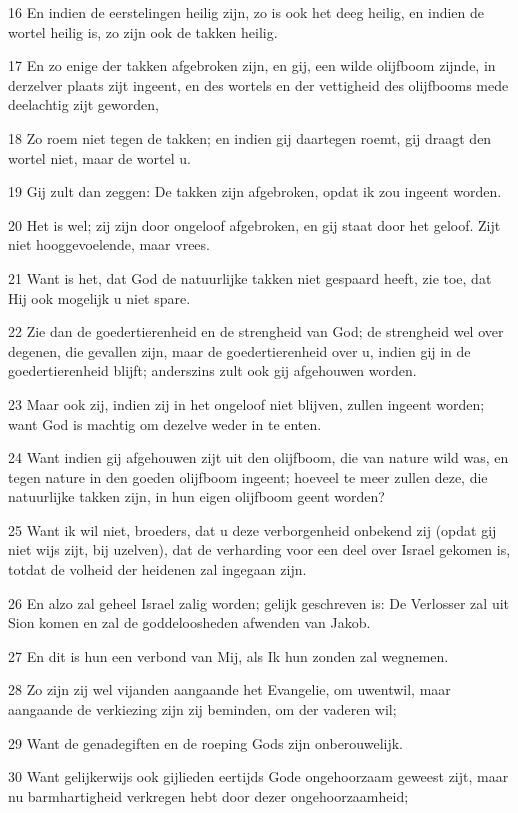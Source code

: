 \par 16 En indien de eerstelingen heilig zijn, zo is ook het deeg heilig, en indien de wortel heilig is, zo zijn ook de takken heilig.
\par 17 En zo enige der takken afgebroken zijn, en gij, een wilde olijfboom zijnde, in derzelver plaats zijt ingeent, en des wortels en der vettigheid des olijfbooms mede deelachtig zijt geworden,
\par 18 Zo roem niet tegen de takken; en indien gij daartegen roemt, gij draagt den wortel niet, maar de wortel u.
\par 19 Gij zult dan zeggen: De takken zijn afgebroken, opdat ik zou ingeent worden.
\par 20 Het is wel; zij zijn door ongeloof afgebroken, en gij staat door het geloof. Zijt niet hooggevoelende, maar vrees.
\par 21 Want is het, dat God de natuurlijke takken niet gespaard heeft, zie toe, dat Hij ook mogelijk u niet spare.
\par 22 Zie dan de goedertierenheid en de strengheid van God; de strengheid wel over degenen, die gevallen zijn, maar de goedertierenheid over u, indien gij in de goedertierenheid blijft; anderszins zult ook gij afgehouwen worden.
\par 23 Maar ook zij, indien zij in het ongeloof niet blijven, zullen ingeent worden; want God is machtig om dezelve weder in te enten.
\par 24 Want indien gij afgehouwen zijt uit den olijfboom, die van nature wild was, en tegen nature in den goeden olijfboom ingeent; hoeveel te meer zullen deze, die natuurlijke takken zijn, in hun eigen olijfboom geent worden?
\par 25 Want ik wil niet, broeders, dat u deze verborgenheid onbekend zij (opdat gij niet wijs zijt, bij uzelven), dat de verharding voor een deel over Israel gekomen is, totdat de volheid der heidenen zal ingegaan zijn.
\par 26 En alzo zal geheel Israel zalig worden; gelijk geschreven is: De Verlosser zal uit Sion komen en zal de goddeloosheden afwenden van Jakob.
\par 27 En dit is hun een verbond van Mij, als Ik hun zonden zal wegnemen.
\par 28 Zo zijn zij wel vijanden aangaande het Evangelie, om uwentwil, maar aangaande de verkiezing zijn zij beminden, om der vaderen wil;
\par 29 Want de genadegiften en de roeping Gods zijn onberouwelijk.
\par 30 Want gelijkerwijs ook gijlieden eertijds Gode ongehoorzaam geweest zijt, maar nu barmhartigheid verkregen hebt door dezer ongehoorzaamheid;
